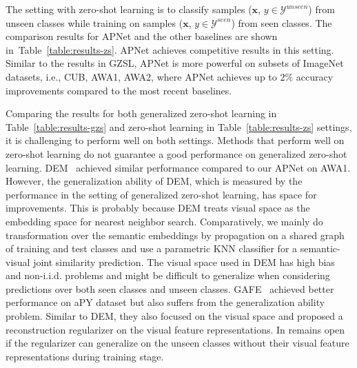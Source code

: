 \documentclass[letterpaper]{article} %
\def\Tabref#1{Table~\ref{#1}}
\def\vx{{\bm{x}}}
\begin{document}
\noindent The setting with zero-shot learning is to classify samples ($\vx$, $y \in \mathcal{Y}^{unseen}$) from unseen classes while training on samples ($\vx$, $y \in \mathcal{Y}^{seen}$) from seen classes. The comparison results for APNet and the other baselines are shown in~\Tabref{table:results-zs}.
APNet achieves competitive results in this setting.
Similar to the results in GZSL, APNet is more powerful on subsets of ImageNet datasets, i.e., CUB, AWA1, AWA2, where APNet achieves up to $2\%$ accuracy improvements compared to the most recent baselines.


Comparing the results for both generalized zero-shot learning in Table~\ref{table:results-gzs} and zero-shot learning in Table~\ref{table:results-zs} settings, it is challenging to perform well on both settings. Methods that perform well on zero-shot learning do not guarantee a good performance on generalized zero-shot learning.
DEM~\cite{zhang2017learning} achieved similar performance compared to our APNet on AWA1. However, the generalization ability of DEM, which is measured by the performance in the setting of generalized zero-shot learning, has space for improvements. This is probably because DEM treats visual space as the embedding space for nearest neighbor search. Comparatively, we mainly do transformation over the semantic embeddings by propagation on a shared graph of training and test classes and use a parametric KNN classifier for a semantic-visual joint similarity prediction. 
The visual space used in DEM has high bias and non-i.i.d. problems and might be difficult to generalize when considering predictions over both seen classes and unseen classes.
GAFE~\cite{wang2017mgae} achieved better performance on aPY dataset but also suffers from the generalization ability problem. Similar to DEM, they also focused on the visual space and proposed a reconstruction regularizer on the visual feature representations. In remains open if the regularizer can generalize on the unseen classes without their visual feature representations during training stage.




\end{document}
